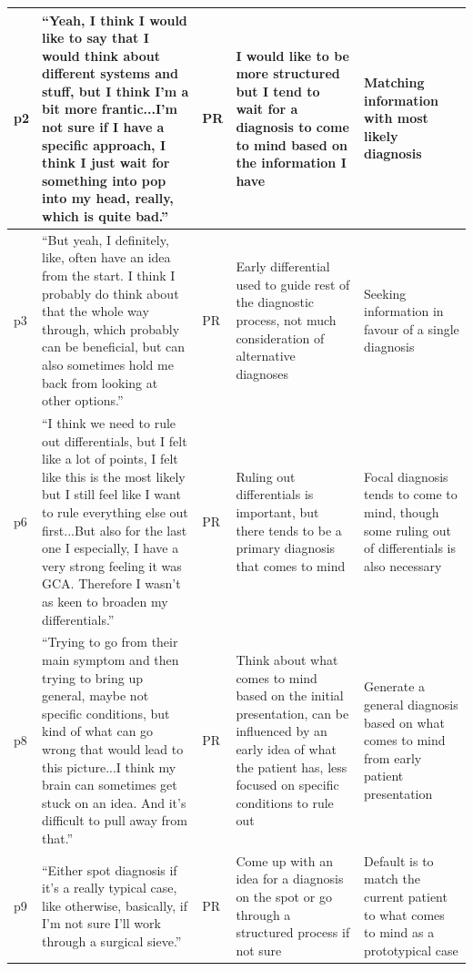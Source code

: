 \documentclass[a4paper, nobind]{templates/ociamthesis}
\begin{document}
\begin{longtable}{>{\raggedright\arraybackslash}p{5em}|>{\raggedright\arraybackslash}p{14em}|>{\raggedright\arraybackslash}p{3em}|>{\raggedright\arraybackslash}p{6em}|>{\raggedright\arraybackslash}p{6em}}
\hline
p2 & “Yeah, I think I would like to say that I would think about different systems and stuff, but I think I'm a bit more frantic...I'm not sure if I have a specific approach, I think I just wait for something into pop into my head, really, which is quite bad.” & PR & I would like to be more structured but I tend to wait for a diagnosis to come to mind based on the information I have & Matching information with most likely diagnosis\\
\hline
p3 & “But yeah, I definitely, like, often have an idea from the start. I think I probably do think about that the whole way through, which probably can be beneficial, but can also sometimes hold me back from looking at other options.” & PR & Early differential used to guide rest of the diagnostic process, not much consideration of alternative diagnoses & Seeking information in favour of a single diagnosis\\
\hline
p6 & “I think we need to rule out differentials, but I felt like a lot of points, I felt like this is the most likely but I still feel like I want to rule everything else out first...But also for the last one I especially, I have a very strong feeling it was GCA. Therefore I wasn't as keen to broaden my differentials.” & PR & Ruling out differentials is important, but there tends to be a primary diagnosis that comes to mind & Focal diagnosis tends to come to mind, though some ruling out of differentials is also necessary\\
\hline
p8 & “Trying to go from their main symptom and then trying to bring up general, maybe not specific conditions, but kind of what can go wrong that would lead to this picture...I think my brain can sometimes get stuck on an idea. And it's difficult to pull away from that.” & PR & Think about what comes to mind based on the initial presentation, can be influenced by an early idea of what the patient has, less focused on specific conditions to rule out & Generate a general diagnosis based on what comes to mind from early patient presentation\\
\hline
p9 & “Either spot diagnosis if it's a really typical case, like otherwise, basically, if I'm not sure I'll work through a surgical sieve.” & PR & Come up with an idea for a diagnosis on the spot or go through a structured process if not sure & Default is to match the current patient to what comes to mind as a prototypical case\\
\hline

\end{longtable}
\end{document}
